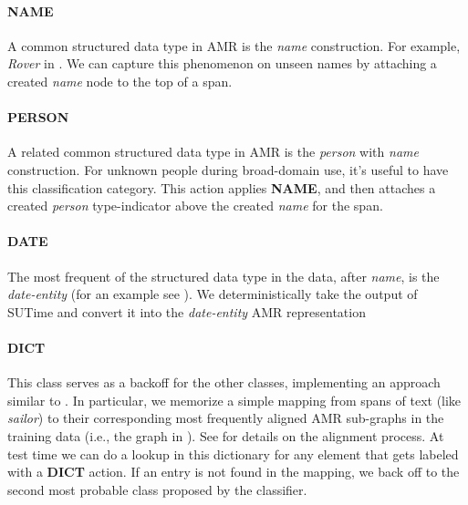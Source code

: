\documentclass[11pt]{article}
\newcommand\w[1]{\textit{#1}} %
\newcommand\n[1]{\textit{#1}} %
\begin{document}
\paragraph{NAME} A common structured data type in AMR is the \n{name} construction. 
For example, \w{Rover} in .
We can capture this phenomenon on unseen names by attaching a created \n{name} node to the top of a span.

\paragraph{PERSON} A related common structured data type in AMR is the \n{person} with \n{name} construction. 
For unknown people during broad-domain use, it's useful to have this classification category.
This action applies \textbf{NAME}, and then attaches a created \n{person} type-indicator above the created \n{name} for the span.

\paragraph{DATE} The most frequent of the structured data type in the data, after \n{name}, is the \n{date-entity} (for an example see ).
We deterministically take the output of SUTime \cite{2012chang-temporal}
  and convert it into the \n{date-entity} AMR representation

\paragraph{DICT} This class serves as a backoff for the other classes, implementing
an approach similar to .
In particular, we memorize a simple mapping from spans of text
  (like \w{sailor}) to their corresponding most frequently aligned AMR sub-graphs 
  in the training data (i.e., the graph in ). 
See  for details on the alignment process.
At test time we can do a lookup in this dictionary for any element that gets 
  labeled with a \textbf{DICT} action. 
If an entry is not found in the mapping, we back off to the second most probable
  class proposed by the classifier.
\end{document}
